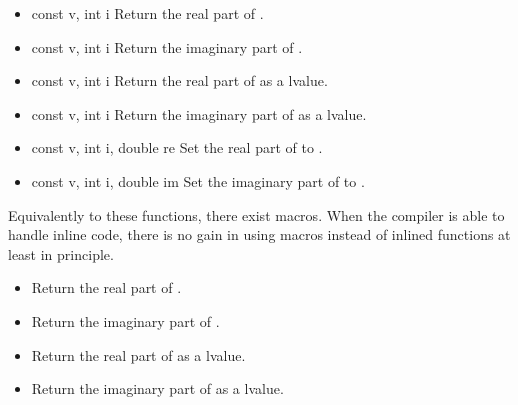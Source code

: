 \begin{itemize}
\item {}
  {const  \ptr v, int i}
  \sshortdescribe Return the real part of .
  
\item {}
  {const  \ptr v, int i}
  \sshortdescribe Return the imaginary part of .

\item {}
  {const  \ptr v, int i}
  \sshortdescribe Return the real part of  as a lvalue.

\item {}
  {const  \ptr v, int i}
  \sshortdescribe Return the imaginary part of  as a lvalue.

\item {}
  {const  \ptr v, int i, double re}
  \sshortdescribe Set the real part of  to .

\item {}
  {const  \ptr v, int i, double im}
  \sshortdescribe Set the imaginary part of  to .
\end{itemize}

Equivalently to these functions, there exist macros. When the compiler is able
to handle inline code, there is no gain in using macros instead of inlined
functions at least in principle.
\begin{itemize}
\item {}
  \sshortdescribe Return the real part of .
  
\item {}
  \sshortdescribe Return the imaginary part of .
  
\item {}
  \sshortdescribe Return the real part of  as a lvalue.
  
\item {}
  \sshortdescribe Return the imaginary part of  as a lvalue.
\end{itemize}

